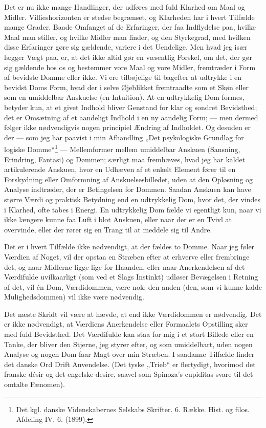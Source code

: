 \documentclass[12pt,a4paper,openany]{book}
\newcommand{\opage}[1]{\marginnote{\footnotesize\textit{[#1]}}}
\begin{document}
\setcounter{footnote}{0}%
\opage{35}Det er nu ikke mange Handlinger, der udføres med fuld
Klarhed om Maal og Midler. Villieshorizonten er stedse begrænset,
og Klarheden har i hvert Tilfælde mange Grader.
Baade Omfanget af de Erfaringer, der faa Indflydelse paa,
hvilke Maal man stiller, og hvilke Midler man finder, og den
Styrkegrad, med hvilken disse Erfaringer gøre sig gældende,
variere i det Uendelige. Men hvad jeg især lægger Vægt
paa, er, at det ikke altid gør en væsentlig Forskel, om det,
der gør sig gældende hos os og bestemmer vore Maal og vore
Midler, fremtræder i Form af bevidste Domme eller ikke. Vi
ere tilbøjelige til bagefter at udtrykke i en bevidst Doms Form,
hvad der i selve Øjeblikket fremtraadte som et Skøn eller som
en umiddelbar Anskuelse (en Intuition). At en udtrykkelig
Dom formes, betyder kun, at et givet Indhold bliver Genstand
for klar og sondret Bevidsthed; det er Omsætning af et aandeligt
Indhold i en ny aandelig Form; --- men dermed følger ikke
nødvendigvis nogen principiel Ændring af Indholdet. Og desuden
er der --- som jeg har paavist i min Afhandling „Det
psykologiske Grundlag for logiske Domme“\footnote[1]{Det kgl. danske Videnskabernes Selskabs Skrifter. 6. Række. Hist. og filos. Afdeling IV, 6. (1899).} --- Mellemformer
mellem umiddelbar Anskuen (Sansning, Erindring, Fantasi) og
Dømmen; særligt maa fremhæves, hvad jeg har kaldet artikulerende
Anskuen, hvor en Udhæven af et enkelt Element fører
til en Forskydning eller Omformning af Anskuelsesbilledet,
uden at den Opløsning og Analyse indtræder, der er Betingelsen
for Dommen. Saadan Anskuen kan have større Værdi og praktisk
Betydning end en udtrykkelig Dom, hvor det, der vindes i
Klarhed, ofte tabes i Energi. En udtrykkelig Dom fælde vi
egentligt kun, naar vi ikke længere kunne faa Luft i blot Anskuen,
eller naar der er en Tvivl at overvinde, eller der rører
sig en Trang til at meddele sig til Andre.

Det er i hvert Tilfælde ikke nødvendigt, at der fældes to
Domme. Naar jeg føler Værdien af Noget, vil der opstaa en
Stræben efter at erhverve eller frembringe det, og naar Midlerne
ligge lige for Haanden, eller naar Anerkendelsen af det
\setcounter{footnote}{0}%
\opage{36}Værdifulde uvilkaarligt (som ved et Slags Instinkt) udløser Bevægelsen
i Retning af det, vil én Dom, Værdidommen, være
nok; den anden (den, som vi kunne kalde Mulighedsdommen)
vil ikke være nødvendig.

Det næste Skridt vil være at hævde, at end ikke Værdidommen
er nødvendig. Det er ikke nødvendigt, at Værdiens
Anerkendelse eller Formaalets Opstilling sker med fuld Bevidsthed.
Det Værdifulde kan staa for mig i et stort Billede eller
en Tanke, der bliver den Stjerne, jeg styrer efter, og som
umiddelbart, uden nogen Analyse og nogen Dom faar Magt
over min Stræben. I saadanne Tilfælde finder det danske Ord
Drift Anvendelse. (Det tyske „Trieb“ er flertydigt, hvorimod
det franske désir og det engelske desire, saavel som Spinoza’s
cupiditas svare til det omtalte Fænomen).
\end{document}
